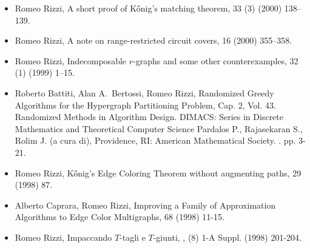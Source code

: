 \documentclass[10pt]{article}
\begin{document}
\begin{itemize}
  \vspace{1.4mm}
  \item {\sc Romeo Rizzi},
   \newblock  A short proof of K\H{o}nig's matching theorem,
    33 (3) (2000) 138--139.

  \vspace{1.4mm}
  \item {\sc Romeo Rizzi},
   \newblock  A note on range-restricted circuit covers,
    16 (2000) 355--358.

  \vspace{1.4mm}
  \item {\sc Romeo Rizzi},
   \newblock  Indecomposable $r$-graphs and some other counterexamples,
    32 (1) (1999) 1--15.
 
  \vspace{1.4mm}
  \item {\sc Roberto Battiti, Alan A.~Bertossi, Romeo Rizzi},  
   \newblock  Randomized Greedy Algorithms 
              for the Hypergraph Partitioning Problem,
   \newblock Cap. 2, Vol. 43.
   \newblock Randomized Methods in Algorithm Design.
   \newblock DIMACS: Series in Discrete Mathematics
             and Theoretical Computer Science
   \newblock Pardalos P., Rajasekaran S., Rolim J. (a
 cura di), Providence, RI: American Mathematical Society.
   . pp. 3-21.

  \vspace{1.4mm}
  \item {\sc Romeo Rizzi},
   \newblock  K\H{o}nig's Edge Coloring Theorem without augmenting paths,
    29 (1998) 87.

  \vspace{1.4mm}
  \item {\sc Alberto Caprara, Romeo Rizzi},  
   \newblock  Improving a Family of Approximation
              Algorithms to Edge Color Multigraphs,
    68 (1998) 11-15.

  \vspace{1.4mm}
  \item {\sc Romeo Rizzi},
   \newblock  Impaccando $T$-tagli e $T$-giunti,
   ,
             (8) 1-A Suppl. (1998) 201-204.

\end{itemize}
\end{document}

